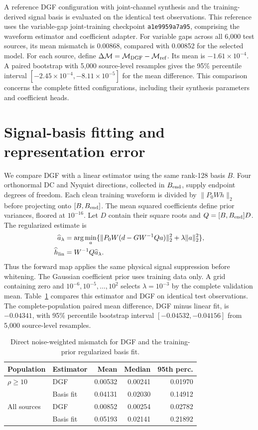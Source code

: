 \documentclass[10pt,prd,aps,a4paper,twocolumn,superscriptaddress,nofootinbib,floatfix]{revtex4-2}
\begin{document}
A reference DGF configuration with joint-channel synthesis and the training-derived signal basis is evaluated on the identical test observations. This reference uses the variable-gap joint-training checkpoint \texttt{a1e9959a7a95}, comprising the waveform estimator and coefficient adapter. For variable gaps across all 6,000 test sources, its mean mismatch is 0.00868, compared with 0.00852 for the selected model. For each source, define $\Delta\mathcal M=\mathcal M_{\rm DGF}-\mathcal M_{\rm ref}$. Its mean is $-1.61\times10^{-4}$. A paired bootstrap with 5,000 source-level resamples gives the 95\% percentile interval $[-2.45\times10^{-4},-8.11\times10^{-5}]$ for the mean difference. This comparison concerns the complete fitted configurations, including their synthesis parameters and coefficient heads.



\section{Signal-basis fitting and representation error}\label{app:basis_comparison}
We compare DGF with a linear estimator using the same rank-128 basis $B$. Four orthonormal DC and Nyquist directions, collected in $B_{\rm end}$, supply endpoint degrees of freedom. Each clean training waveform is divided by $\|P_0Wh\|_2$ before projecting onto $[B,B_{\rm end}]$. The mean squared coefficients define prior variances, floored at $10^{-16}$. Let $D$ contain their square roots and $Q=[B,B_{\rm end}]D$. The regularized estimate is
\begin{align}
\widehat a_\lambda&=\arg\min_a\{\|P_0W(d-GW^{-1}Qa)\|_2^2+\lambda\|a\|_2^2\},\nonumber\\
\widehat h_{\rm lin}&=W^{-1}Q\widehat a_\lambda.
\end{align}
Thus the forward map applies the same physical signal suppression before whitening. The Gaussian coefficient prior uses training data only. A grid containing zero and $10^{-6},10^{-5},\ldots,10^2$ selects $\lambda=10^{-3}$ by the complete validation mean. Table~\ref{tab:basis_fit} compares this estimator and DGF on identical test observations. The complete-population paired mean difference, DGF minus linear fit, is $-0.04341$, with 95\% percentile bootstrap interval $[-0.04532,-0.04156]$ from 5,000 source-level resamples.

\begin{table}[t]\centering\setlength{\tabcolsep}{3pt}
\caption{Direct noise-weighted mismatch for DGF and the training-prior regularized basis fit.}\label{tab:basis_fit}
\begin{tabular}{llrrr}\hline\hline
Population & Estimator & Mean & Median & 95th perc.\\\hline
$\rho\ge10$ & DGF & 0.00532 & 0.00241 & 0.01970\\
& Basis fit & 0.04131 & 0.02030 & 0.14912\\
All sources & DGF & 0.00852 & 0.00254 & 0.02782\\
& Basis fit & 0.05193 & 0.02141 & 0.21892\\
\hline\hline\end{tabular}\end{table}
\end{document}
